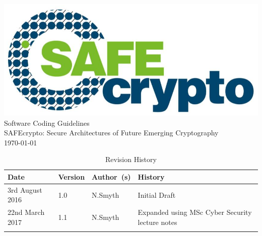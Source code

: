 \documentclass[a4paper]{report}
\newcommand\blankpage{%
    \null%
    \thispagestyle{empty}%
    \addtocounter{page}{-1}%
    \newpage}
\begin{document}
\hypersetup{pageanchor=false}

\begin{titlepage}
\vspace*{7cm}
\begin{center}
\includegraphics[scale=0.5]{../Resources/SAFEcrypto.png}\\
\vspace*{1cm}
{\huge Software Coding Guidelines}\\
\vspace*{1cm}
{\LARGE SAFEcrypto: Secure Architectures of Future Emerging Cryptography}\\
\vspace*{0.5cm}
{\small \today}\\
\end{center}
\end{titlepage}

\afterpage{\blankpage}
\clearpage


\begin{table}[t!]
\centering
\caption{Revision History}
\label{my-label}
\begin{tabularx}{\textwidth}{lllX}
\toprule
\textbf{Date} &\textbf{Version} &\textbf{Author~(s)} &\textbf{History}  \\
\midrule
3rd August 2016 &1.0 &N.Smyth &Initial Draft  \\
\midrule
22nd March 2017 &1.1 &N.Smyth &Expanded using MSc Cyber Security lecture notes \\
\midrule
 &  &  & \\
 \bottomrule
\end{tabularx}
\end{table}

\clearpage

\tableofcontents


\hypersetup{pageanchor=true}










\printindex
\end{document}
